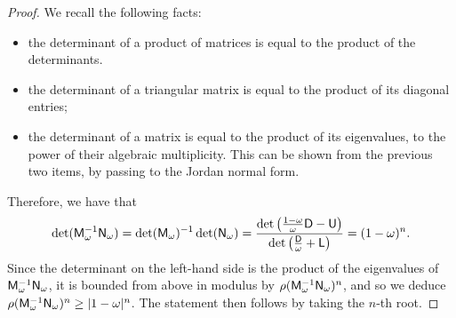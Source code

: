 \begin{proof}
    We recall the following facts:
    \begin{itemize}
        \item the determinant of a product of matrices is equal to the product of the determinants.
        \item the determinant of a triangular matrix is equal to the product of its diagonal entries;
        \item the determinant of a matrix is equal to the product of its eigenvalues,
            to the power of their algebraic multiplicity.
            This can be shown from the previous two items,
            by passing to the Jordan normal form.
    \end{itemize}
    Therefore,
    we have that
    \[
        \det (\mathsf M_{\omega}^{-1} \mathsf N_{\omega}) = \det (\mathsf M_{\omega})^{-1}  \det (\mathsf N_{\omega})
        = \frac {\det \left(\frac{1 - \omega}{\omega} \mathsf D - \mathsf U \right)}{\det \left( \frac{\mathsf D}{\omega} + \mathsf L \right)}
        = (1 - \omega)^n.
    \]
    Since the determinant on the left-hand side is the product of the eigenvalues of $\mathsf M_{\omega}^{-1} \mathsf N_{\omega}$,
    it is bounded from above in modulus by $\rho(\mathsf M_{\omega}^{-1} \mathsf N_{\omega})^n$,
    and so we deduce $\rho(\mathsf M_{\omega}^{-1} \mathsf N_{\omega})^n \geq \lvert1 - \omega\rvert^n$.
    The statement then follows by taking the $n$-th root.
\end{proof}

